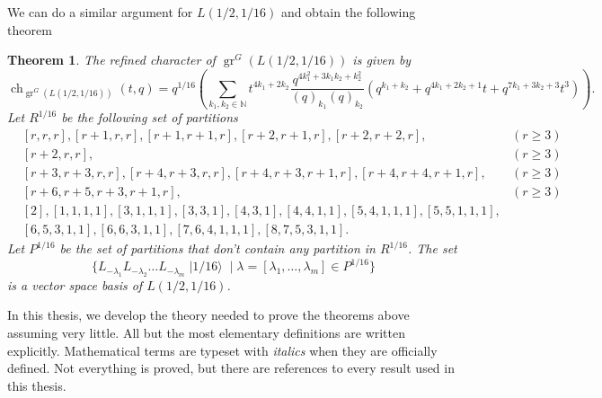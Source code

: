 \documentclass[a4paper, 12pt, reqno]{amsart}
\newtheorem{theorem}{Theorem}[section]
\theoremstyle{remark}
\numberwithin{equation}{subsection}
\DeclareMathOperator{\gr}{gr}
\DeclareMathOperator{\ch}{ch}
\DeclareMathOperator{\vacsixteen}{|1/16\rangle}
\begin{document}
We can do a similar argument for $L(1/2, 1/16)$ and obtain the following theorem

\begin{theorem}
  \label{thr:5}
  The refined character of $\gr^G(L(1/2, 1/16))$ is given by
  \begin{equation*}
    \ch_{\gr^G(L(1/2, 1/16))}(t, q) = q^{1/16}\left(\sum_{k_1, k_2 \in \mathbb{N}}t^{4k_1 + 2k_2}\frac{q^{4k_1^2 + 3k_1k_2 + k_2^2}}{(q)_{k_1}(q)_{k_2}}(q^{k_1 + k_2} + q^{4k_1 + 2k_2 + 1}t + q^{7k_1 + 3k_2 + 3}t^3)\right).
  \end{equation*}
  Let $R^{1/16}$ be the following set of partitions
  \begin{equation*}
    \begin{aligned}
    &[r, r, r], [r + 1, r, r], [r + 1, r + 1, r], [r + 2, r + 1, r], [r + 2, r + 2, r], &(r \ge 3) \\
    &[r + 2, r, r], &(r \ge 3) \\
    &[r + 3, r + 3, r, r], [r + 4, r + 3, r, r],  [r + 4, r + 3, r + 1, r], [r + 4, r + 4, r + 1, r], &(r \ge 3)\\
    &[r + 6, r + 5, r + 3, r + 1, r], &(r \ge 3) \\
    &[2], [1, 1, 1, 1], [3, 1, 1, 1], [3, 3, 1], [4, 3, 1], [4, 4, 1, 1], [5, 4, 1, 1, 1], [5, 5, 1, 1, 1], \\
    &[6, 5, 3, 1, 1], [6, 6, 3, 1, 1], [7, 6, 4, 1, 1, 1], [8, 7, 5, 3, 1, 1].
    \end{aligned}
  \end{equation*}
  Let $P^{1/16}$ be the set of partitions that don't contain any partition in $R^{1/16}$.
  The set
  \begin{equation*}
    \{L_{-\lambda_1}L_{-\lambda_2}\dots L_{-\lambda_m}\vacsixteen \mid \lambda = [\lambda_1, \dots, \lambda_m] \in P^{1/16}\}
  \end{equation*}
  is a vector space basis of $L(1/2, 1/16)$.
\end{theorem}

In this thesis, we develop the theory needed to prove the theorems above assuming very little.
All but the most elementary definitions are written explicitly.
Mathematical terms are typeset with \emph{italics} when they are officially defined.
Not everything is proved, but there are references to every result used in this thesis.
\end{document}
